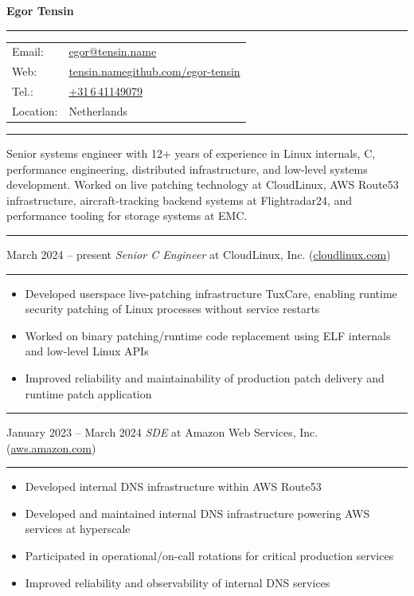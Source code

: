 \documentclass[12pt]{article}
\makeatletter
\newcommand\CvName{Egor Tensin}
\newcommand\CvEmail{egor@tensin.name}
\newcommand\CXX{C\nolinebreak[4]\hspace{-.05em}\raisebox{.4ex}{\relsize{-3}{\textbf{++}}}}
\newcommand\CvSmallSkipLength{0.5em}
\newcommand\CvBigSkipLength{1em}
\newcommand\CvSkip[1]{\vspace{#1}}
\newcommand\CvSmallSkip{\CvSkip{\CvSmallSkipLength}}
\newcommand\CvBigSkip{\CvSkip{\CvBigSkipLength}}
\newcommand\CvRule{\begingroup\color{CvRuleColor}\hrule\endgroup}
\newcommand\CvWorkplaceHeader[5]{\begingroup%
  \CvRule\nopagebreak%
  \fboxsep0pt%
  \colorbox{CvWorkplaceHeaderColor}{%
    \begin{minipage}{\linewidth-2\fboxsep}%
\CvSmallSkip%
#1 -- #2 \hfill \textit{#3} at #4 (\href{http://#5/}{#5})%
\CvSmallSkip%
    \end{minipage}%
  }%
  \CvRule%
\endgroup%
}
\newenvironment{CvWorkplaceDescription}{%
    \begingroup\setlength\parskip{\CvSmallSkipLength}%
  }{%
    \CvSmallSkip\endgroup%
  }
\makeatother
\begin{document}
{\bfseries\Large \CvName}
\CvBigSkip
\CvRule
\CvSmallSkip
\begin{tabularx}{\textwidth}{@{}lX}
Email: & \href{mailto:\CvEmail}{\CvEmail} \\
Web: & \href{https://tensin.name/}{tensin.name}\enspace{}\textopenbullet{}\enspace{}\href{https://github.com/egor-tensin}{github.com/egor-tensin} \\
Tel.: & \href{https://t.me/egor_tensin}{+31\,6\,41149079} \\
Location: & Netherlands \\
\end{tabularx}
\CvSmallSkip
\CvRule

\CvBigSkip
Senior systems engineer with 12+ years of experience in Linux internals, \CXX, performance engineering, distributed infrastructure, and low-level systems development.
Worked on live patching technology at CloudLinux, AWS Route53 infrastructure, aircraft-tracking backend systems at Flightradar24, and performance tooling for storage systems at EMC.
\CvBigSkip

\CvWorkplaceHeader{March 2024}{present}{Senior {\CXX} Engineer}{CloudLinux, Inc.}{cloudlinux.com}

\begin{CvWorkplaceDescription}
\begin{itemize}[noitemsep]
  \item Developed userspace live-patching infrastructure TuxCare, enabling runtime security patching of Linux processes without service restarts
  \item Worked on binary patching/runtime code replacement using ELF internals and low-level Linux APIs
  \item Improved reliability and maintainability of production patch delivery and runtime patch application
\end{itemize}
\end{CvWorkplaceDescription}

\CvWorkplaceHeader{January 2023}{March 2024}{SDE}{Amazon Web Services, Inc.}{aws.amazon.com}

\begin{CvWorkplaceDescription}
\begin{itemize}[noitemsep]
  \item Developed internal DNS infrastructure within AWS Route53
  \item Developed and maintained internal DNS infrastructure powering AWS services at hyperscale
  \item Participated in operational/on-call rotations for critical production services
  \item Improved reliability and observability of internal DNS services
\end{itemize}
\end{CvWorkplaceDescription}
\end{document}

